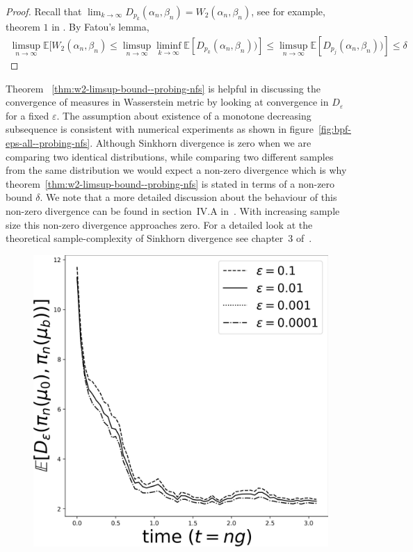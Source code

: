 {\begin{thm}
\begin{proof}
Recall that $\lim_{k\to\infty}D_{p_k} (\alpha_n, \beta_n) = W_2 (\alpha_n, \beta_n)$, see for example, theorem $1$ in \cite{genevay2018learning}. By Fatou's lemma,
\begin{align}
    \limsup_{n\to\infty}\mathbb E[W_2 (\alpha_n, \beta_n) \le \limsup_{n\to\infty}\liminf_{k\to\infty}\mathbb E[D_{p_k}(\alpha_n, \beta_n))] \le  \limsup_{n\to\infty}\mathbb E[D_{p_j}(\alpha_n, \beta_n))]\le\delta
\end{align}
\end{proof}
\label{thm:w2-limsup-bound--probing-nfs}
\end{thm}
Theorem ~\ref{thm:w2-limsup-bound--probing-nfs} is helpful in discussing the convergence of measures in Wasserstein metric by looking at convergence in $D_\varepsilon$ for a fixed $\varepsilon$. The assumption about existence of a monotone decreasing subsequence is consistent with numerical experiments as shown in figure~\ref{fig:bpf-eps-all--probing-nfs}. Although Sinkhorn divergence is zero when we are comparing two identical distributions, while comparing two different samples from the same distribution we would expect a non-zero divergence which is why theorem~\ref{thm:w2-limsup-bound--probing-nfs}  is stated in terms of a non-zero bound $\delta$. We note that a more detailed discussion about the behaviour of this non-zero divergence can be found in section~IV.A in~\cite{mandal2021stability}. With increasing sample size this non-zero divergence approaches zero. For a detailed look at the theoretical sample-complexity of Sinkhorn divergence see chapter~$3$ of~\cite{genevay2019entropy}.
\begin{figure}
    \centering
    \includegraphics[scale=0.15]{probing-nfs/plots/plots-bpf-eps_all.jpg}

\end{figure}}

